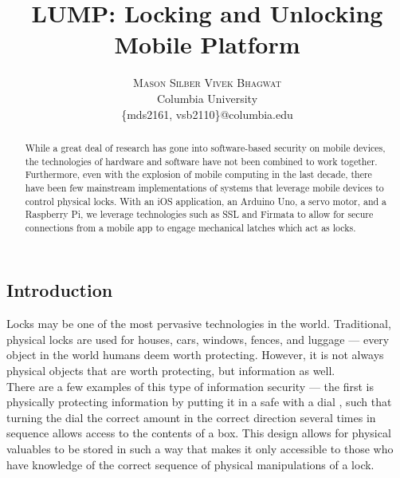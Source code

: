 \documentclass[10pt]{article}
\title{\vspace{-15mm}\fontsize{24pt}{10pt}\selectfont\textbf{LUMP: Locking and Unlocking Mobile Platform}} %
\author{
    \large
    \textsc{Mason Silber \quad Vivek Bhagwat}\\[2mm] %
    \normalsize Columbia University \\ %
    \normalsize \{mds2161, vsb2110\}@columbia.edu %
    \vspace{-5mm}
}
\date{}
\begin{document}
\maketitle %



\begin{multicols}{2} %


\begin{abstract}

While a great deal of research has gone into software-based security on mobile devices, the technologies of hardware and software have not been combined to work together. Furthermore, even with the explosion of mobile computing in the last decade, there have been few mainstream implementations of systems that leverage mobile devices to control physical locks. With an iOS application, an Arduino Uno, a servo motor, and a Raspberry Pi, we leverage technologies such as SSL and Firmata to allow for secure connections from a mobile app to engage mechanical latches which act as locks.

\end{abstract}

\section{Introduction}
Locks may be one of the most pervasive technologies in the world. Traditional, physical locks are used for houses, cars, windows, fences, and luggage --- every object in the world humans deem worth protecting. However, it is not always physical objects that are worth protecting, but information as well.\\

There are a few examples of this type of information security --- the first is physically protecting information by putting it in a safe with a dial \cite{safestructure}, such that turning the dial the correct amount in the correct direction several times in sequence allows access to the contents of a box. This design allows for physical valuables to be stored in such a way that makes it only accessible to those who have knowledge of the correct sequence of physical manipulations of a lock. \\


\end{multicols}
\end{document}

